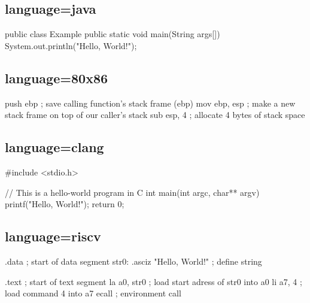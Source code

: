 \documentclass[
    narrow,
    fontstyle=light,
    babelparam=ngerman
]{elite}
\begin{document}
\subsection{language=java}
\label{subsec:language=java}

\begincode
\begin{CodeListing}[language=java, caption=Beispiel-Code]
public class Example {
    public static void main(String args[]) {
        System.out.println("Hello, World!");
    }
}
\end{CodeListing}
\endcode

\subsection{language=80x86}
\label{subsec:language=80x86}

\begincode
\begin{CodeListing}[language=80x86, title=Intel 80x86 Assembler Beispiel]
push    ebp       ; save calling function's stack frame (ebp)
mov     ebp, esp  ; make a new stack frame on top of our caller's stack
sub     esp, 4    ; allocate 4 bytes of stack space
\end{CodeListing}
\endcode

\subsection{language=clang}
\label{subsec:language=clang}

\begincode
\begin{CodeListing}[language=clang, title=Example C-Code]
#include <stdio.h>

// This is a hello-world program in C
int main(int argc, char** argv)
{
    printf("Hello, World!\n");
    return 0;
}
\end{CodeListing}
\endcode

\subsection{language=riscv}
\label{subsec:language=riscv}

\begincode
\begin{CodeListing}[language=riscv, title=Example RISC-V Assembler]
        .data                       ; start of data segment
str0:   .asciz "Hello, World!\n"    ; define string

        .text                       ; start of text segment
        la a0, str0                 ; load start adress of str0 into a0
        li a7, 4                    ; load command 4 into a7
        ecall                       ; environment call
\end{CodeListing}
\endcode

\printindices


\lstlistoflistings
\listoffigures
\end{document}
